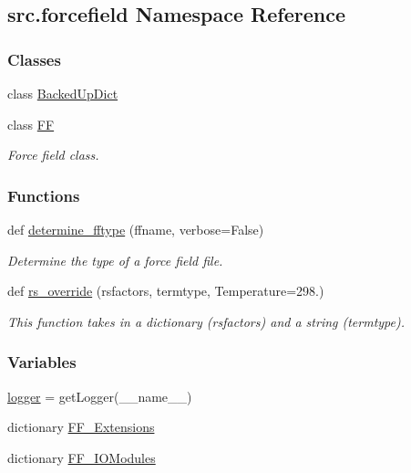 \hypertarget{namespacesrc_1_1forcefield}{}\subsection{src.\+forcefield Namespace Reference}
\label{namespacesrc_1_1forcefield}
\subsubsection*{Classes}
\begin{DoxyCompactItemize}
\item 
class \hyperlink{classsrc_1_1forcefield_1_1BackedUpDict}{Backed\+Up\+Dict}
\item 
class \hyperlink{classsrc_1_1forcefield_1_1FF}{FF}
\begin{DoxyCompactList}\small\item\em Force field class. \end{DoxyCompactList}\end{DoxyCompactItemize}
\subsubsection*{Functions}
\begin{DoxyCompactItemize}
\item 
def \hyperlink{namespacesrc_1_1forcefield_a21066ef8f8395e0b0c7cc6700791d70b}{determine\+\_\+fftype} (ffname, verbose=False)
\begin{DoxyCompactList}\small\item\em Determine the type of a force field file. \end{DoxyCompactList}\item 
def \hyperlink{namespacesrc_1_1forcefield_a2dd794c9844e1c875997ab1b21f4284a}{rs\+\_\+override} (rsfactors, termtype, Temperature=298.)
\begin{DoxyCompactList}\small\item\em This function takes in a dictionary (rsfactors) and a string (termtype). \end{DoxyCompactList}\end{DoxyCompactItemize}
\subsubsection*{Variables}
\begin{DoxyCompactItemize}
\item 
\hyperlink{namespacesrc_1_1forcefield_a75e3cd97344b3c003c73bf0540e85fa0}{logger} = get\+Logger(\+\_\+\+\_\+name\+\_\+\+\_\+)
\item 
dictionary \hyperlink{namespacesrc_1_1forcefield_a6d3bd556905ef9bd38f108995be63bb7}{F\+F\+\_\+\+Extensions}
\item 
dictionary \hyperlink{namespacesrc_1_1forcefield_a629afe3f91d5e48026b8bab018aefe30}{F\+F\+\_\+\+I\+O\+Modules}
\end{DoxyCompactItemize}


